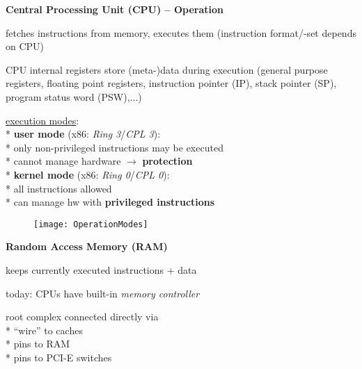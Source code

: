 \textbf{Central Processing Unit (CPU) -- Operation}
\begin{items}
	\item fetches instructions from memory, executes them (instruction format/-set depends on CPU)
	\item CPU internal registers store (meta-)data during execution (general purpose registers, floating point registers, instruction pointer (IP), stack pointer (SP), program status word (PSW),...)
	\item \underline{execution modes}: \\*
		\textbf{user mode} (x86: \emph{Ring 3}/\emph{CPL 3}): \\*
			\phantom{x} only non-privileged instructions may be executed \\*
			\phantom{x} cannot manage hardware \( \to \) \textbf{protection} \\*
		\textbf{kernel mode} (x86: \emph{Ring 0}/\emph{CPL 0}): \\*
			\phantom{x} all instructions allowed \\*
			\phantom{x} can manage hw with \textbf{privileged instructions}
		\begin{figure}[H]\centering\label{OperationModes}\texttt{[image: OperationModes]}\end{figure}
\end{items}

\textbf{Random Access Memory (RAM)}
\begin{items}
	\item keeps currently executed instructions + data
	\item today: CPUs have built-in \emph{memory controller}
	\item root complex connected directly via \\*
		"`wire"' to caches \\*
		pins to RAM \\*
		pins to PCI-E switches
\end{items}

